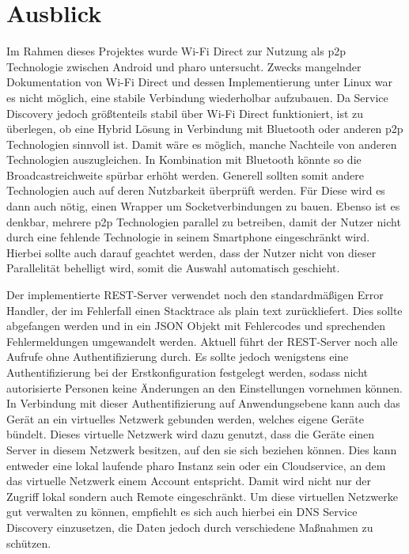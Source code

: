 \section{Ausblick}
	Im Rahmen dieses Projektes wurde Wi-Fi Direct zur Nutzung als p2p Technologie zwischen Android und pharo untersucht. Zwecks mangelnder Dokumentation von Wi-Fi Direct und dessen Implementierung unter Linux war es nicht möglich, eine stabile Verbindung wiederholbar aufzubauen. Da Service Discovery jedoch größtenteils stabil über Wi-Fi Direct funktioniert, ist zu überlegen, ob eine Hybrid Lösung in Verbindung mit Bluetooth oder anderen p2p Technologien sinnvoll ist. Damit wäre es möglich, manche Nachteile von anderen Technologien auszugleichen. In Kombination mit Bluetooth könnte so die Broadcastreichweite spürbar erhöht werden. Generell sollten somit andere Technologien auch auf deren Nutzbarkeit überprüft werden. Für Diese wird es dann auch nötig, einen Wrapper um Socketverbindungen zu bauen.
	Ebenso ist es denkbar, mehrere p2p Technologien parallel zu betreiben, damit der Nutzer nicht durch eine fehlende Technologie in seinem Smartphone eingeschränkt wird. Hierbei sollte auch darauf geachtet werden, dass der Nutzer nicht von dieser Parallelität behelligt wird, somit die Auswahl automatisch geschieht.
	
	Der implementierte REST-Server verwendet noch den standardmäßigen Error Handler, der im Fehlerfall einen Stacktrace als plain text zurückliefert. Dies sollte abgefangen werden und in ein JSON Objekt mit Fehlercodes und sprechenden Fehlermeldungen umgewandelt werden. Aktuell führt der REST-Server noch alle Aufrufe ohne Authentifizierung durch. Es sollte jedoch wenigstens eine Authentifizierung bei der Erstkonfiguration festgelegt werden, sodass nicht autorisierte Personen keine Änderungen an den Einstellungen vornehmen können.
	In Verbindung mit dieser Authentifizierung auf Anwendungsebene kann auch das Gerät an ein virtuelles Netzwerk gebunden werden, welches eigene Geräte bündelt. Dieses virtuelle Netzwerk wird dazu genutzt, dass die Geräte einen Server in diesem Netzwerk besitzen, auf den sie sich beziehen können. Dies kann entweder eine lokal laufende pharo Instanz sein oder ein Cloudservice, an dem das virtuelle Netzwerk einem Account entspricht. Damit wird nicht nur der Zugriff lokal sondern auch Remote eingeschränkt. Um diese virtuellen Netzwerke gut verwalten zu können, empfiehlt es sich auch hierbei ein DNS Service Discovery einzusetzen, die Daten jedoch durch verschiedene Maßnahmen zu schützen.\cite[S.8]{Kaiser2}
	

